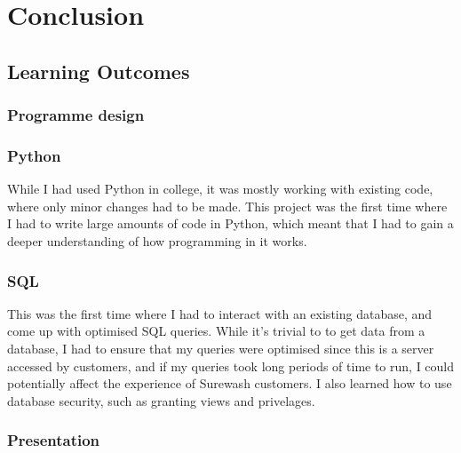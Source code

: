 
\section{Conclusion}
    \subsection{Learning Outcomes}
        \subsubsection{Programme design}
            \subsubsection{Python}
            While I had used Python in college, it was mostly working with existing code, where only minor changes had to be made. This project was the first time where I had to write large amounts of code in Python, which meant that I had to gain a deeper understanding of how programming in it works.
            \subsubsection{SQL}
            This was the first time where I had to interact with an existing database, and come up with optimised SQL queries. While it's trivial to to get data from a database, I had to ensure that my queries were optimised since this is a server accessed by customers, and if my queries took long periods of time to run, I could potentially affect the experience of Surewash customers. I also learned how to use database security, such as granting views and privelages.
        \subsubsection{Presentation}
